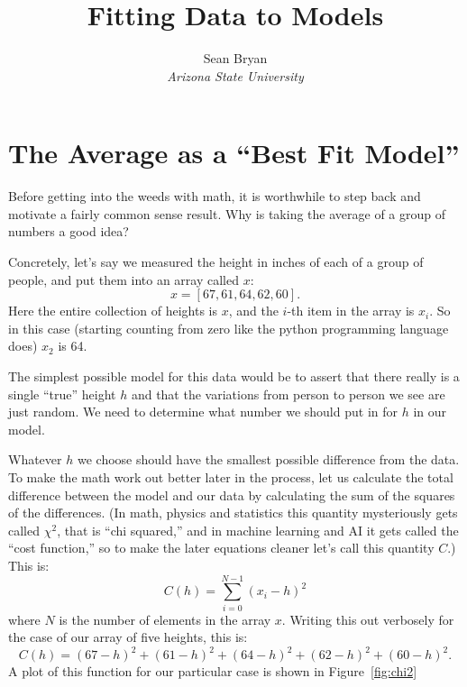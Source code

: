 \documentclass[12pt]{article}
\title{Fitting Data to Models}
\author{Sean Bryan\\\textit{Arizona State University}}
\date{}
\begin{document}
\maketitle

\thispagestyle{fancy}

\section{The Average as a ``Best Fit Model''}

Before getting into the weeds with math, it is worthwhile to step back and motivate a fairly common sense result. Why is taking the average of a group of numbers a good idea?

Concretely, let's say we measured the height in inches of each of a group of people, and put them into an array called $x$:
\begin{equation}
x = [67,61,64,62,60].
\end{equation}
Here the entire collection of heights is $x$, and the $i$-th item in the array is $x_i$. So in this case (starting counting from zero like the python programming language does) $x_2$ is 64.

The simplest possible model for this data would be to assert that there really is a single ``true'' height $h$ and that the variations from person to person we see are just random. We need to determine what number we should put in for $h$ in our model.

Whatever $h$ we choose should have the smallest possible difference from the data. To make the math work out better later in the process, let us calculate the total difference between the model and our data by calculating the sum of the squares of the differences. (In math, physics and statistics this quantity mysteriously gets called $\chi^2$, that is ``chi squared,'' and in machine learning and AI it gets called the ``cost function,'' so to make the later equations cleaner let's call this quantity $C$.) This is:
\begin{equation}\label{eq:fancyCmean}
C(h) = \sum_{i=0}^{N-1} (x_i - h)^2
\end{equation}
where $N$ is the number of elements in the array $x$. Writing this out verbosely for the case of our array of five heights, this is:
\begin{equation}
C(h) = (67-h)^2 + (61-h)^2 + (64-h)^2 + (62-h)^2 + (60-h)^2.
\end{equation}
A plot of this function for our particular case is shown in Figure~\ref{fig:chi2}
\end{document}
